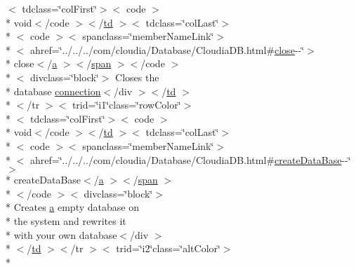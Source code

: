 \begin{DoxyCompactItemize}
$<$ tdclass=\char`\"{}col\-First\char`\"{}$>$$<$ code $>$\\*
 void$<$/code $>$$<$/\hyperlink{stylesheet_8css_a2635d454965afd759ce151c6f6d1a04a}{td} $>$$<$ tdclass=\char`\"{}col\-Last\char`\"{}$>$\\*
$<$ code $>$$<$ spanclass=\char`\"{}member\-Name\-Link\char`\"{}$>$\\*
$<$ ahref=\char`\"{}../../../com/cloudia/Database/Cloudia\-D\-B.\-html\#\hyperlink{index-3_8html_a92dfa11a0151a89a031325214d44f705}{close}-\/-\/\char`\"{}$>$\\*
 close$<$/\hyperlink{style_8css_a5e8981582017bb8b84c21f148345d1f7}{a} $>$$<$/\hyperlink{stylesheet_8css_a8343996ebcf16220b04e54659aac31cc}{span} $>$$<$/code $>$\\*
$<$ divclass=\char`\"{}block\char`\"{}$>$ Closes the \\*
database \hyperlink{stations_8js_a72816e56a343a3a61b3e7e5868b3e086}{connection}$<$/div $>$$<$/\hyperlink{stylesheet_8css_a2635d454965afd759ce151c6f6d1a04a}{td} $>$\\*
$<$/tr $>$$<$ trid=\char`\"{}i1\char`\"{}class=\char`\"{}row\-Color\char`\"{}$>$\\*
$<$ tdclass=\char`\"{}col\-First\char`\"{}$>$$<$ code $>$\\*
 void$<$/code $>$$<$/\hyperlink{stylesheet_8css_a2635d454965afd759ce151c6f6d1a04a}{td} $>$$<$ tdclass=\char`\"{}col\-Last\char`\"{}$>$\\*
$<$ code $>$$<$ spanclass=\char`\"{}member\-Name\-Link\char`\"{}$>$\\*
$<$ ahref=\char`\"{}../../../com/cloudia/Database/Cloudia\-D\-B.\-html\#\hyperlink{index-3_8html_af77a5a36cb36cc171a4082bc86425374}{create\-Data\-Base}-\/-\/\char`\"{}$>$\\*
 create\-Data\-Base$<$/\hyperlink{style_8css_a5e8981582017bb8b84c21f148345d1f7}{a} $>$$<$/\hyperlink{stylesheet_8css_a8343996ebcf16220b04e54659aac31cc}{span} $>$\\*
$<$/code $>$$<$ divclass=\char`\"{}block\char`\"{}$>$\\*
 Creates \hyperlink{style_8css_a5e8981582017bb8b84c21f148345d1f7}{a} empty database on \\*
the system and rewrites it \\*
with your own database$<$/div $>$\\*
$<$/\hyperlink{stylesheet_8css_a2635d454965afd759ce151c6f6d1a04a}{td} $>$$<$/tr $>$$<$ trid=\char`\"{}i2\char`\"{}class=\char`\"{}alt\-Color\char`\"{}$>$\\*

\end{DoxyCompactItemize}
